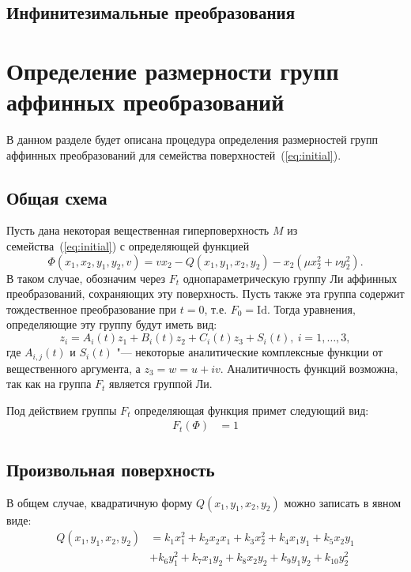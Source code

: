 \documentclass[a4paper,14pt]{extarticle}
\begin{document}
\subsection{Инфинитезимальные преобразования}
\lipsum[8]


\section{Определение размерности групп аффинных преобразований}
В данном разделе будет описана процедура определения размерностей групп аффинных преобразований для семейства поверхностей~(\ref{eq:initial}).
\subsection{Общая схема}
Пусть дана некоторая вещественная гиперповерхность $M$ из семейства~(\ref{eq:initial}) с определяющей функцией $$\Phi(x_1, x_2, y_1, y_2, v) = v x_2 - Q(x_1, y_1, x_2, y_2) - x_2 (\mu x_2^2 + \nu y_2^2).$$ В таком случае, обозначим через $F_t$ однопараметрическую группу Ли аффинных преобразований, сохраняющих эту поверхность. Пусть также эта группа содержит тождественное преобразование при $t = 0$, т.е. $F_0 = \textrm{Id}$. Тогда уравнения, определяющие эту группу будут иметь вид:
\begin{equation}
z_i = A_{i}(t) z_1 + B_{i}(t) z_2 + C_{i}(t) z_3 + S_i(t),\ i = 1, \hdots, 3,
\end{equation}
где $A_{i,j}(t)$ и $S_i(t)$ "--- некоторые аналитические комплексные функции от вещественного аргумента, а $z_3 = w = u + i v$. Аналитичность функций возможна, так как на группа $F_t$ является группой Ли.

Под действием группы $F_t$ определяющая функция примет следующий вид:
\begin{align*}
F_t(\Phi) &= 1
\end{align*}

\subsection{Произвольная поверхность}
В общем случае, квадратичную форму $Q(x_1, y_1, x_2, y_2)$ можно записать в явном виде: 
\begin{align*}
Q(x_1, y_1, x_2, y_2) &= k_1 x_1^2 + k_2 x_2 x_1 + k_3 x_2^2 + k_4 x_1 y_1 + k_5 x_2 y_1 \\
&+ k_6 y_1^2 + k_7 x_1 y_2 + k_8 x_2 y_2 + k_9 y_1 y_2 + k_{10} y_2^2
\end{align*}
\end{document}
